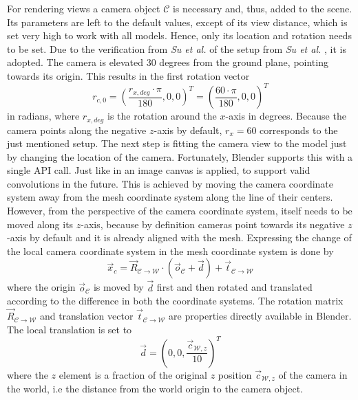 For rendering views a camera object $\mathcal{C}$ is necessary and, thus, added to the scene.
Its parameters are left to the default values, except of its view distance, which is set very high to work with all models.
Hence, only its location and rotation needs to be set.
Due to the verification from \textit{Su et al.} \cite{Su2018} of the setup from \textit{Su et al.} \cite{Su:2015:MCN:2919332.2919750}, it is adopted.
The camera is elevated 30 degrees from the ground plane, pointing towards its origin.
This results in the first rotation vector
\begin{equation}
	r_{c,0} = \left( \frac{r_{x,deg} \cdot \pi}{180}, 0, 0 \right)^T = \left( \frac{60 \cdot \pi}{180}, 0, 0 \right)^T
\end{equation}
in radians, where $r_{x,deg}$ is the rotation around the $x$-axis in degrees.
Because the camera points along the negative $z$-axis by default, $r_x = 60$ corresponds to the just mentioned setup.
The next step is fitting the camera view to the model just by changing the location of the camera.
Fortunately, Blender supports this with a single API call.
Just like in \cite{Su2018} an image canvas is applied, to support valid convolutions in the future.
This is achieved by moving the camera coordinate system away from the mesh coordinate system along the line of their centers.
However, from the perspective of the camera coordinate system, itself needs to be moved along its $z$-axis, because by definition cameras point towards its negative $z$-axis by default and it is already aligned with the mesh.
Expressing the change of the local camera coordinate system in the mesh coordinate system is done by
\begin{equation}
	\vec{x}_c = \vec{R}_{\mathcal{C} \rightarrow \mathcal{W}} \cdot (\vec{o}_{\mathcal{C}} + \vec{d}) + \vec{t}_{\mathcal{C} \rightarrow \mathcal{W}}
\end{equation}
where the origin $\vec{o}_{\mathcal{C}}$ is moved by $\vec{d}$ first and then rotated and translated according to the difference in both the coordinate systems.
The rotation matrix $\vec{R}_{\mathcal{C} \rightarrow \mathcal{W}}$ and translation vector $\vec{t}_{\mathcal{C} \rightarrow \mathcal{W}}$ are properties directly available in Blender.
The local translation is set to
\begin{equation}
	\vec{d} = \left( 0, 0, \frac{\vec{c}_{\mathcal{W}, z}}{10} \right)^T
\end{equation}
where the $z$ element is a fraction of the original $z$ position $\vec{c}_{\mathcal{W}, z}$ of the camera in the world, i.e the distance from the world origin to the camera object.
